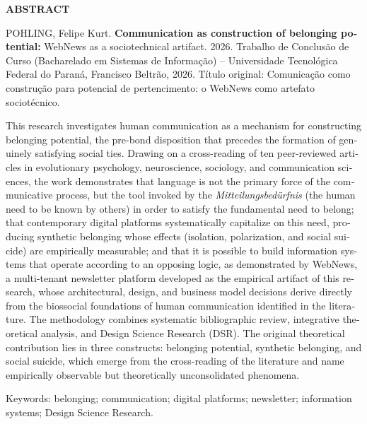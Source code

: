 \documentclass[12pt,a4paper]{article}
\begin{document}
\begin{english}
\begin{center}
  \begin{onehalfspace}
  \textbf{ABSTRACT}
  \end{onehalfspace}
\end{center}
\vspace{1cm}

\begin{singlespace}
\raggedright
POHLING, Felipe Kurt. \textbf{Communication as construction of belonging
potential:} WebNews as a sociotechnical artifact. 2026. Trabalho de
Conclusão de Curso (Bacharelado em Sistemas de Informação) --
Universidade Tecnológica Federal do Paraná, Francisco Beltrão, 2026.
Título original: Comunicação como construção para potencial de
pertencimento: o WebNews como artefato sociotécnico.
\par
\end{singlespace}

\vspace{0.6cm}

\begin{singlespace}
This research investigates human communication as
a mechanism for constructing belonging potential,
the pre-bond disposition that precedes the formation of
genuinely satisfying social ties. Drawing on a cross-reading
of ten peer-reviewed articles in evolutionary psychology,
neuroscience, sociology, and communication sciences, the
work demonstrates that language is not the primary force
of the communicative process, but the tool invoked by the
\textit{Mitteilungsbedürfnis} (the human need to be known
by others) in order to satisfy the fundamental need to
belong; that contemporary digital platforms systematically
capitalize on this need, producing synthetic
belonging whose effects (isolation, polarization, and
social suicide) are empirically measurable; and that
it is possible to build information systems that operate
according to an opposing logic, as demonstrated by
WebNews, a multi-tenant newsletter platform developed as
the empirical artifact of this research, whose
architectural, design, and business model decisions derive
directly from the biossocial foundations of human
communication identified in the literature. The methodology
combines systematic bibliographic review, integrative
theoretical analysis, and Design Science Research (DSR).
The original theoretical contribution lies in three
constructs: belonging potential,
synthetic belonging, and social suicide,
which emerge from the cross-reading of the literature
and name empirically observable but theoretically
unconsolidated phenomena.
\par
\end{singlespace}

\vspace{0.6cm}

\begin{singlespace}
\raggedright
Keywords: belonging; communication; digital platforms; newsletter;
information systems; Design Science Research.
\par
\end{singlespace}
\end{english}
\end{document}
